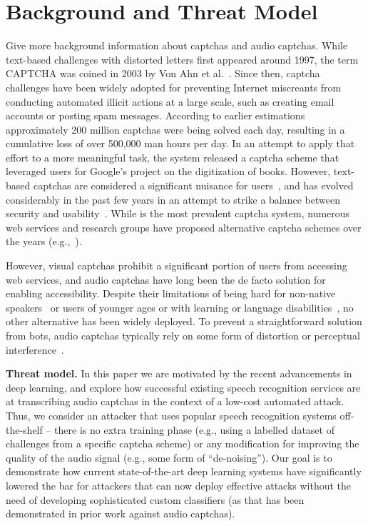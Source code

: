 \section{Background and Threat Model}
\label{sec:background}

Give more background information about captchas and audio captchas.
While text-based challenges with distorted letters first appeared around 1997,
the term CAPTCHA was coined in 2003 by Von Ahn et al.~\cite{captcha}. Since 
then, captcha challenges have been widely adopted for preventing Internet 
miscreants from conducting automated illicit actions at a large scale, such as 
creating email accounts or posting spam messages. According to earlier estimations~\cite{captcha_stats}
approximately 200 million captchas were being solved each day, resulting in a
cumulative loss of over 500,000 man hours per day. In an attempt to apply that 
effort to a more meaningful task, the \re system released a captcha scheme that
leveraged users for Google's project on the digitization of books. However, 
text-based captchas are considered a significant nuisance for users~\cite{scientific_american},
and \re has evolved considerably in the past few years in an attempt to strike 
a balance between security and usability~\cite{recaptcha}. While \re is the
most prevalent captcha system, numerous web services and research groups have 
proposed alternative captcha schemes over the years (e.g.,~\cite{Chew04,asirra,dcaptcha}).

However, visual captchas prohibit a significant portion of users from accessing 
web services, and audio captchas have long been the de facto solution for
enabling accessibility. Despite their limitations of being hard for
non-native speakers~\cite{yan2008usability} or users of younger ages 
or with learning or language disabilities~\cite{schlaikjer2007dual},
no other alternative has been widely deployed.
To prevent a straightforward solution from bots, audio captchas 
typically rely on some form of distortion or perceptual interference~\cite{shinn2008object}.

\textbf{Threat model.} In this paper we are motivated by the recent advancements 
in deep learning, and explore how successful existing speech recognition services
are at transcribing audio captchas in the context of a low-cost automated attack.
Thus, we consider an attacker that uses popular speech recognition systems off-the-shelf --
there is no extra training phase (e.g., using a labelled dataset of challenges from 
a specific captcha scheme) or any modification for improving the quality of the audio 
signal (e.g., some form of ``de-noising''). Our goal is to demonstrate how current 
state-of-the-art deep learning systems have significantly lowered the bar for attackers
that can now deploy effective attacks without the need of developing sophisticated 
custom classifiers (as that has been demonstrated in prior work against audio captchas).

